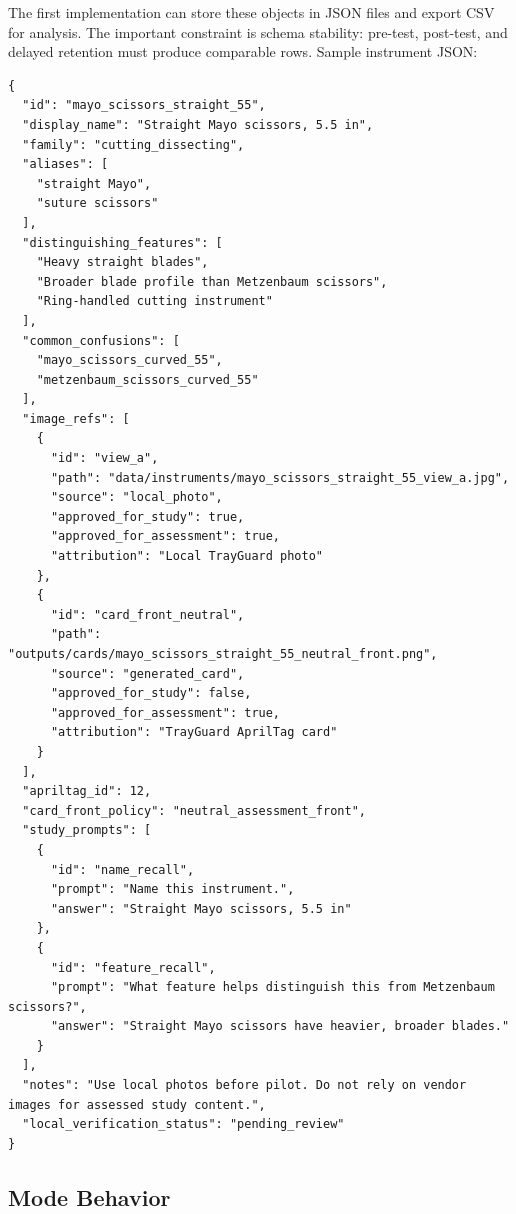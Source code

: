 \documentclass[10pt,a4paper]{article}
\begin{document}
The first implementation can store these objects in JSON files and export CSV
for analysis. The important constraint is schema stability: pre-test, post-test,
and delayed retention must produce comparable rows.
Sample instrument JSON:
\begin{lstlisting}
{
  "id": "mayo_scissors_straight_55",
  "display_name": "Straight Mayo scissors, 5.5 in",
  "family": "cutting_dissecting",
  "aliases": [
    "straight Mayo",
    "suture scissors"
  ],
  "distinguishing_features": [
    "Heavy straight blades",
    "Broader blade profile than Metzenbaum scissors",
    "Ring-handled cutting instrument"
  ],
  "common_confusions": [
    "mayo_scissors_curved_55",
    "metzenbaum_scissors_curved_55"
  ],
  "image_refs": [
    {
      "id": "view_a",
      "path": "data/instruments/mayo_scissors_straight_55_view_a.jpg",
      "source": "local_photo",
      "approved_for_study": true,
      "approved_for_assessment": true,
      "attribution": "Local TrayGuard photo"
    },
    {
      "id": "card_front_neutral",
      "path": "outputs/cards/mayo_scissors_straight_55_neutral_front.png",
      "source": "generated_card",
      "approved_for_study": false,
      "approved_for_assessment": true,
      "attribution": "TrayGuard AprilTag card"
    }
  ],
  "apriltag_id": 12,
  "card_front_policy": "neutral_assessment_front",
  "study_prompts": [
    {
      "id": "name_recall",
      "prompt": "Name this instrument.",
      "answer": "Straight Mayo scissors, 5.5 in"
    },
    {
      "id": "feature_recall",
      "prompt": "What feature helps distinguish this from Metzenbaum scissors?",
      "answer": "Straight Mayo scissors have heavier, broader blades."
    }
  ],
  "notes": "Use local photos before pilot. Do not rely on vendor images for assessed study content.",
  "local_verification_status": "pending_review"
}
\end{lstlisting}
\subsection{Mode Behavior}
\end{document}
